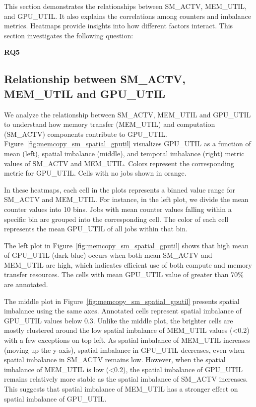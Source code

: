 This section demonstrates the relationships between SM\_ACTV, MEM\_UTIL,
and GPU\_UTIL. It also explains the correlations among counters and imbalance
metrics. Heatmaps provide insights into how different
factors interact. This section investigates the following question:
%
\begin{RQcallout}
    {\bf RQ5 }{\it \RQfive{}}
\end{RQcallout}

\subsection{Relationship between SM\_ACTV, MEM\_UTIL and GPU\_UTIL}

We analyze the relationship between SM\_ACTV, MEM\_UTIL and GPU\_UTIL
to understand how memory transfer (MEM\_UTIL) and
computation (SM\_ACTV) components contribute to GPU\_UTIL.
Figure~\ref{fig:memcopy_sm_spatial_gputil} visualizes
GPU\_UTIL as a function of mean (left), spatial imbalance (middle),
and temporal imbalance (right) metric values of SM\_ACTV and MEM\_UTIL.
Colors represent the corresponding metric for GPU\_UTIL. Cells with no
jobs shown in orange.

In these heatmaps, each cell in the plots represents a binned value range for
SM\_ACTV and MEM\_UTIL. For instance, in the left plot, we divide the mean
counter values into 10 bins. Jobs with mean counter values falling within a
specific bin are grouped into the
corresponding cell. The color of each cell represents the mean GPU\_UTIL of all
jobs within that bin.


The left plot in Figure~\ref{fig:memcopy_sm_spatial_gputil} shows
that high mean of GPU\_UTIL (dark blue) occurs when both
mean SM\_ACTV and MEM\_UTIL are high, which indicates efficient use
of both compute and memory transfer resources. The cells with
mean GPU\_UTIL value of greater than 70\% are annotated.

The middle plot in Figure~\ref{fig:memcopy_sm_spatial_gputil} presents spatial
imbalance using the same axes. Annotated cells represent spatial imbalance of
GPU\_UTIL values below 0.3. Unlike the middle plot, the brighter cells are mostly
clustered around the low spatial imbalance of MEM\_UTIL values (\textless0.2) with
a few exceptions on top left. As spatial imbalance of MEM\_UTIL increases
(moving up the y-axis), spatial imbalance in GPU\_UTIL decreases,
even when spatial imbalance in SM\_ACTV remains low. However, when the
spatial imbalance of MEM\_UTIL is low (\textless0.2), the spatial
imbalance of GPU\_UTIL remains relatively more stable as the spatial
imbalance of SM\_ACTV increases. This suggests that spatial imbalance of
MEM\_UTIL has a stronger effect on spatial imbalance of GPU\_UTIL.

